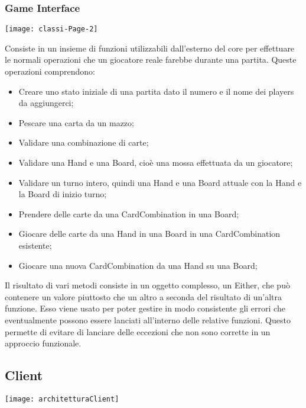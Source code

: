 \subsubsection{Game Interface}
\begin{center}
    \texttt{[image: classi-Page-2]}
\end{center}
Consiste in un insieme di funzioni utilizzabili dall’esterno del core per effettuare le normali operazioni che un giocatore reale farebbe durante una partita.
Queste operazioni comprendono:
\begin{itemize}
    \item Creare uno stato iniziale di una partita dato il numero e il nome dei players da aggiungerci;
    \item Pescare una carta da un mazzo;
    \item Validare una combinazione di carte;
    \item Validare una Hand e una Board, cioè una mossa effettuata da un giocatore;
    \item Validare un turno intero, quindi una Hand e una Board attuale con la Hand e la Board di inizio turno;
    \item Prendere delle carte da una CardCombination in una Board;
    \item Giocare delle carte da una Hand in una Board in una CardCombination esistente;
    \item Giocare una nuova CardCombination da una Hand su una Board;
\end{itemize}
Il risultato di vari metodi consiste in un oggetto complesso, un Either, che può contenere un valore piuttosto che un altro a seconda del risultato di un’altra funzione.
Esso viene usato per poter gestire in modo consistente gli errori che eventualmente possono essere lanciati all’interno delle relative funzioni.
Questo permette di evitare di lanciare delle eccezioni che non sono corrette in un approccio funzionale.

\subsection{Client}
\begin{center}
    \texttt{[image: architetturaClient]}
\end{center}

